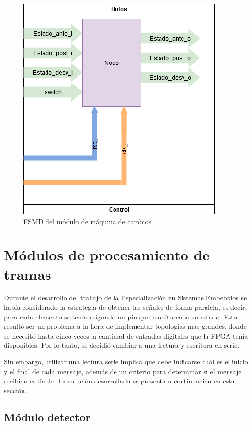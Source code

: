 	\begin{figure}[h]
	\centering
	\includegraphics[scale=.5]{./Figures/FSMD-Cambio}
		\caption{FSMD del módulo de máquina de cambios}
		\label{fig:FSMD_Cambio}
	\end{figure}
		
\section{Módulos de procesamiento de tramas}

	Durante el desarrollo del trabajo de la Especialización en Sistemas Embebidos se había considerado la estrategia de obtener las señales de forma paralela, es decir, para cada elemento se tenía asignado un pin que monitoreaba su estado. Esto resultó ser un problema a la hora de implementar topologías mas grandes, donde se necesitó hasta cinco veces la cantidad de entradas digitales que la FPGA tenía disponibles. Por lo tanto, se decidió cambiar a una lectura y escritura en serie.
	
	Sin embargo, utilizar una lectura serie implica que debe indicarse cuál es el inicio y el final de cada mensaje, además de un criterio para determinar si el mensaje recibido es fiable. La solución desarrollada se presenta a continuación en esta sección.
	
	\subsection{Módulo detector}
	
